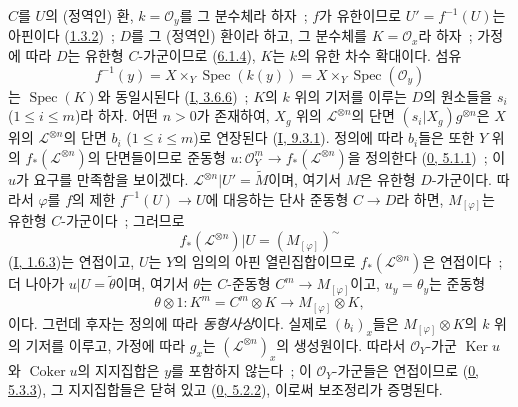 $C$를 $U$의 (정역인) 환, $k=\mathcal{O}_y$를 그 분수체라 하자~;
$f$가 유한이므로 $U'=f^{-1}(U)$는 아핀이다
(\hyperref[II.1.3.2-ko]{1.3.2})~; $D$를 그 (정역인) 환이라 하고,
그 분수체를 $K=\mathcal{O}_x$라 하자~; 가정에 따라 $D$는 유한형
$C$-가군이므로 (\hyperref[II.6.1.4-ko]{6.1.4}), $K$는 $k$의 유한
차수 확대이다. 섬유
\[
f^{-1}(y)=X\times_Y\operatorname{Spec}(k(y))
=X\times_Y\operatorname{Spec}(\mathcal{O}_y)
\]
는 $\operatorname{Spec}(K)$와 동일시된다
(\hyperref[I.3.6.5-ko]{I, 3.6.6})~; $K$의 $k$ 위의 기저를 이루는
$D$의 원소들을 $s_i$ ($1\leq i\leq m$)라 하자. 어떤 $n>0$가
존재하여, $X_g$ 위의 $\mathcal{L}^{\otimes n}$의 단면
$(s_i|X_g)g^{\otimes n}$은 $X$ 위의 $\mathcal{L}^{\otimes n}$의 단면
$b_i$ ($1\leq i\leq m$)로 연장된다
(\hyperref[I.9.3.1-ko]{I, 9.3.1}). 정의에 따라 $b_i$들은 또한 $Y$ 위의
$f_*(\mathcal{L}^{\otimes n})$의 단면들이므로 준동형
$u:\mathcal{O}_Y^m\to f_*(\mathcal{L}^{\otimes n})$을 정의한다
(\hyperref[0.5.1.1-ko]{0, 5.1.1})~; 이 $u$가 요구를 만족함을 보이겠다.
$\mathcal{L}^{\otimes n}|U'=\widetilde{M}$이며, 여기서 $M$은 유한형
$D$-가군이다. 따라서 $\varphi$를 $f$의 제한
$f^{-1}(U)\to U$에 대응하는 단사 준동형 $C\to D$라 하면,
$M_{[\varphi]}$는 유한형 $C$-가군이다~; 그러므로
\[
f_*(\mathcal{L}^{\otimes n})|U=(M_{[\varphi]})^\sim
\]
(\hyperref[I.1.6.3-ko]{I, 1.6.3})는 연접이고, $U$는 $Y$의 임의의 아핀
열린집합이므로 $f_*(\mathcal{L}^{\otimes n})$은 연접이다~; 더 나아가
$u|U=\widetilde{\theta}$이며, 여기서 $\theta$는 $C$-준동형
$C^m\to M_{[\varphi]}$이고, $u_y=\theta_y$는 준동형
\[
\theta\otimes1:K^m=C^m\otimes K\longrightarrow
M_{[\varphi]}\otimes K,
\]
이다. 그런데 후자는 정의에 따라 \emph{동형사상}이다. 실제로
$(b_i)_x$들은 $M_{[\varphi]}\otimes K$의 $k$ 위의 기저를 이루고,
가정에 따라 $g_x$는 $(\mathcal{L}^{\otimes n})_x$의 생성원이다.
따라서 $\mathcal{O}_Y$-가군 $\operatorname{Ker}u$와
$\operatorname{Coker}u$의 지지집합은 $y$를 포함하지 않는다~;
이 $\mathcal{O}_Y$-가군들은 연접이므로
(\hyperref[0.5.3.3-ko]{0, 5.3.3}), 그 지지집합들은 닫혀 있고
(\hyperref[0.5.2.2-ko]{0, 5.2.2}), 이로써 보조정리가 증명된다.

